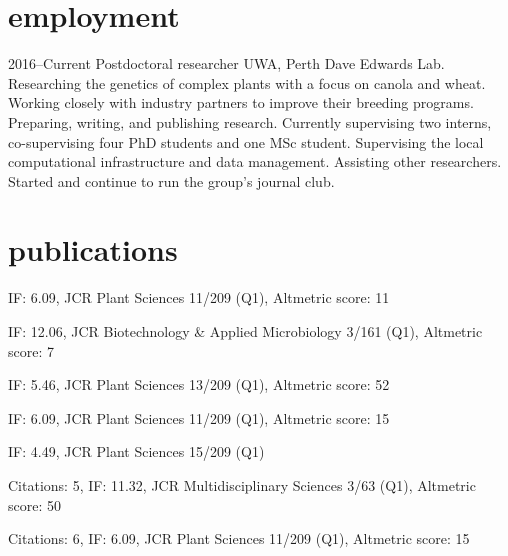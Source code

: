 \documentclass[]{friggeri-cv} %
\begin{document}
\section{employment}
\begin{entrylist}
\entry
{2016--Current}
{Postdoctoral researcher}
{UWA, Perth}
{Dave Edwards Lab. Researching the genetics of complex plants with a focus on canola and wheat. Working closely with industry partners to improve their breeding programs. Preparing, writing, and publishing research. Currently supervising two interns, co-supervising four PhD students and one MSc student. Supervising the local computational infrastructure and data management. Assisting other researchers. Started and continue to run the group's journal club.}
\end{entrylist}


\section{publications}

\cite{bayer2017assembly}
\hspace{0.4cm} IF: 6.09, JCR Plant Sciences 11/209 (Q1), Altmetric score: 11

\cite{yuan2017improvements}
\hspace{0.4cm} IF: 12.06, JCR Biotechnology \& Applied Microbiology 3/161 (Q1), Altmetric score: 7

\cite{montenegro2017pangenome}
\hspace{0.4cm} IF: 5.46, JCR Plant Sciences 13/209 (Q1), Altmetric score: 52

\cite{kaur2017advanced}
\hspace{0.4cm} IF: 6.09, JCR Plant Sciences 11/209 (Q1), Altmetric score: 15

\cite{gacek2016genome}
\hspace{0.4cm} IF: 4.49, JCR Plant Sciences 15/209 (Q1)

\cite{golicz2016pangenome}
\hspace{0.4cm} Citations: 5, IF: 11.32, JCR Multidisciplinary Sciences 3/63 (Q1), Altmetric score: 50

\cite{hane2017comprehensive}
\hspace{0.4cm} Citations: 6, IF: 6.09, JCR Plant Sciences 11/209 (Q1), Altmetric score: 15
\end{document}
